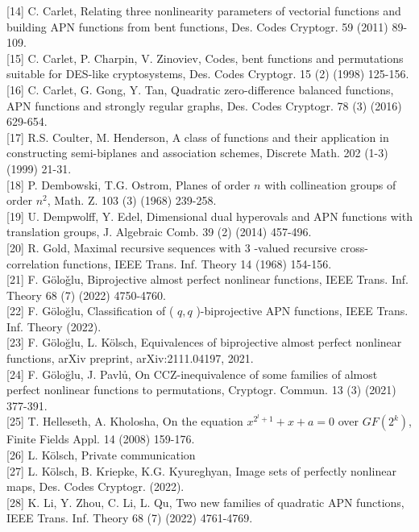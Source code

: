 \documentclass[10pt]{article}
\begin{document}
[14] C. Carlet, Relating three nonlinearity parameters of vectorial functions and building APN functions from bent functions, Des. Codes Cryptogr. 59 (2011) 89-109.\\[0pt]
[15] C. Carlet, P. Charpin, V. Zinoviev, Codes, bent functions and permutations suitable for DES-like cryptosystems, Des. Codes Cryptogr. 15 (2) (1998) 125-156.\\[0pt]
[16] C. Carlet, G. Gong, Y. Tan, Quadratic zero-difference balanced functions, APN functions and strongly regular graphs, Des. Codes Cryptogr. 78 (3) (2016) 629-654.\\[0pt]
[17] R.S. Coulter, M. Henderson, A class of functions and their application in constructing semi-biplanes and association schemes, Discrete Math. 202 (1-3) (1999) 21-31.\\[0pt]
[18] P. Dembowski, T.G. Ostrom, Planes of order $n$ with collineation groups of order $n^{2}$, Math. Z. 103 (3) (1968) 239-258.\\[0pt]
[19] U. Dempwolff, Y. Edel, Dimensional dual hyperovals and APN functions with translation groups, J. Algebraic Comb. 39 (2) (2014) 457-496.\\[0pt]
[20] R. Gold, Maximal recursive sequences with 3 -valued recursive cross-correlation functions, IEEE Trans. Inf. Theory 14 (1968) 154-156.\\[0pt]
[21] F. Göloǧlu, Biprojective almost perfect nonlinear functions, IEEE Trans. Inf. Theory 68 (7) (2022) 4750-4760.\\[0pt]
[22] F. Göloğlu, Classification of ( $q, q$ )-biprojective APN functions, IEEE Trans. Inf. Theory (2022).\\[0pt]
[23] F. Göloğlu, L. Kölsch, Equivalences of biprojective almost perfect nonlinear functions, arXiv preprint, arXiv:2111.04197, 2021.\\[0pt]
[24] F. Göloğlu, J. Pavlủ, On CCZ-inequivalence of some families of almost perfect nonlinear functions to permutations, Cryptogr. Commun. 13 (3) (2021) 377-391.\\[0pt]
[25] T. Helleseth, A. Kholosha, On the equation $x^{2^{l}+1}+x+a=0$ over $G F\left(2^{k}\right)$, Finite Fields Appl. 14 (2008) 159-176.\\[0pt]
[26] L. Kölsch, Private communication\\[0pt]
[27] L. Kölsch, B. Kriepke, K.G. Kyureghyan, Image sets of perfectly nonlinear maps, Des. Codes Cryptogr. (2022).\\[0pt]
[28] K. Li, Y. Zhou, C. Li, L. Qu, Two new families of quadratic APN functions, IEEE Trans. Inf. Theory 68 (7) (2022) 4761-4769.\\[0pt]
\end{document}
